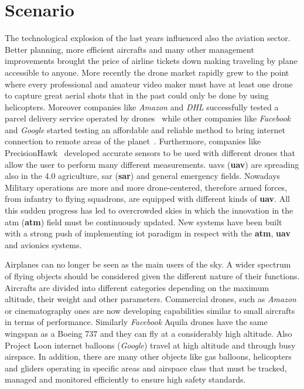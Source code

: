 \documentclass[../main.tex]{subfiles}
\begin{document}
\chapter{Scenario}
\label{chap:avionicsprot}

The technological explosion of the last years influenced also the aviation sector. Better planning, more efficient aircrafts and many other management improvements brought the price of airline tickets down making traveling by plane accessible to anyone. More recently the drone market rapidly grew to the point where every professional and amateur video maker must have at least one drone to capture great aerial shots that in the past could only be done by using helicopters. Moreover companies like \textit{Amazon} and \textit{DHL} successfully tested a parcel delivery service operated by drones~\cite{primeair} while other companies like \textit{Facebook} and \textit{Google} started testing an affordable and reliable method to bring internet connection to remote areas of the planet~\cite{loon}. Furthermore, companies like PrecisionHawk~\cite{prechwk} developed accurate sensors to be used with different drones that allow the user to perform many different measurements. \acrlong{uav}s (\textbf{\acrshort{uav}}) are spreading also in the 4.0 agriculture, \acrlong{sar} (\textbf{\acrshort{sar}}) and general emergency fields\cite{vvff}. Nowadays Military operations are more and more drone-centered, therefore armed forces, from infantry to flying squadrons, are equipped with different kinds of \textbf{\acrshort{uav}}. All this sudden progress has led to overcrowded skies in which the innovation in the \acrlong{atm} (\textbf{\acrshort{atm}}) field must be continuously updated. New systems have been built with a strong push of implementing \acrshort{iot} paradigm in respect with the \textbf{\acrshort{atm}}, \textbf{\acrshort{uav}} and avionics systems.

Airplanes can no longer be seen as the main users of the sky. A wider spectrum of flying objects should be considered given the different nature of their functions. Aircrafts are divided into different categories depending on the maximum altitude, their weight and other parameters. Commercial drones, such as \textit{Amazon} or cinematography ones are now developing capabilities similar to small aircrafts in terms of performance. Similarly \textit{Facebook} Aquila drones have the same wingspan as a Boeing 737 and they can fly at a considerably high altitude\cite{fbaquila}. Also Project Loon internet balloons (\textit{Google}) travel at high altitude and through busy airspace. In addition, there are many other objects like gas balloons, helicopters and gliders operating in specific areas and airspace class that must be tracked, managed and monitored efficiently to ensure high safety standards.
\end{document}
